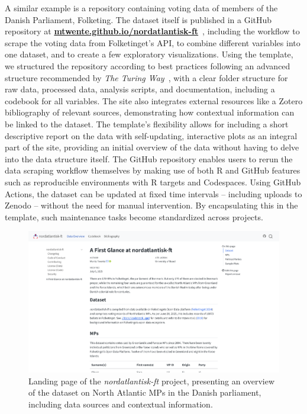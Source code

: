 \documentclass{anthology-ch}         %
\begin{document}
A similar example is a repository containing voting data of members of the Danish Parliament, Folketing. The dataset itself is published in a GitHub repository at \href{http://mtwente.github.io/nordatlantisk-ft}{\textbf{mtwente.github.io/nordatlantisk-ft}}~\cite{twente2024a}, including the workflow to scrape the voting data from Folketinget's API, to combine different variables into one dataset, and to create a few exploratory visualizations. Using the template, we structured the repository according to best practices following an advanced structure recommended by \emph{The Turing Way}~\cite{theturingwaycommunity2025}, with a clear folder structure for raw data, processed data, analysis scripts, and documentation, including a codebook for all variables. The site also integrates external resources like a Zotero bibliography of relevant sources, demonstrating how contextual information can be linked to the dataset. The template's flexibility allows for including a short descriptive report on the data with self-updating, interactive plots as an integral part of the site, providing an initial overview of the data without having to delve into the data structure itself. The GitHub repository enables users to rerun the data scraping workflow themselves by making use of both R and GitHub features such as reproducible environments with R targets and Codespaces. Using GitHub Actions, the dataset can be updated at fixed time intervals -- including uploads to Zenodo -- without the need for manual intervention. By encapsulating this in the template, such maintenance tasks become standardized across projects.

\begin{figure}[t!]
  \centering
  \includegraphics[width=0.9\linewidth]{images/nordatlantisk_ft_report.png}
  \caption{Landing page of the \emph{nordatlantisk-ft} project, presenting an overview of the dataset on North Atlantic MPs in the Danish parliament, including data sources and contextual information.}
  \label{fig-nordatlantisk}
\end{figure}
\end{document}
